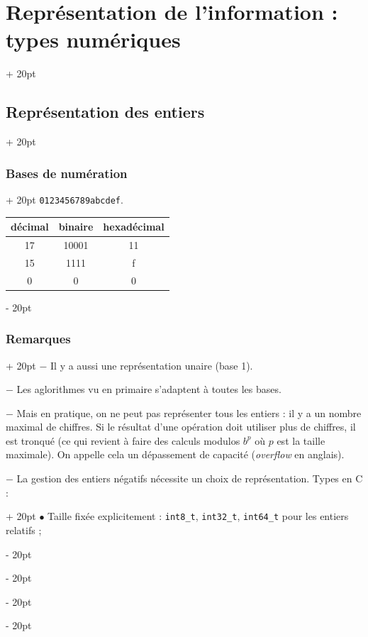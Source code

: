 \documentclass[a4paper, 12pt, twoside]{article}
\newcommand{\ind}[1][20pt]{\advance\leftskip + #1}
\newcommand{\deind}[1][20pt]{\advance\leftskip - #1}
\newenvironment{indentedenv}[1][20pt]{\par \ind[#1]}{\par \deind}
\newenvironment{indt}[2][20pt]{#2 \begin{indentedenv}[#1]}{\end{indentedenv}} %
\begin{document}
\begin{indt}{\section{Représentation de l'information : types numériques}}
\begin{indt}{\subsection{Représentation des entiers}}
\begin{indt}{\subsubsection{Bases de numération}}
                \texttt{0123456789abcdef}.
                
                \vspace{12pt}
                
                \begin{tabular}{|c|c|c|}
                    \hline
                    décimal & binaire & hexadécimal
                    \\
                    \hline
                    17 & 10001 & 11
                    \\
                    \hline
                    15 & 1111 & f
                    \\
                    \hline
                    0 & 0 & 0
                    \\
                    \hline
                \end{tabular}
            \end{indt}
            
            \vspace{12pt}
            
            \begin{indt}{\subsubsection{Remarques}}
                $-$ Il y a aussi une représentation unaire (base 1).
                
                \vspace{6pt}
                
                $-$ Les aglorithmes vu en primaire s'adaptent à toutes les bases.
                
                \vspace{6pt}
                
                $-$ Mais en pratique, on ne peut pas représenter tous les entiers : il y a un nombre maximal de chiffres. Si le résultat d'une opération doit utiliser plus de chiffres, il est tronqué (ce qui revient à faire des calculs modulos $b^p$ où $p$ est la taille maximale). On appelle cela un dépassement de capacité (\textit{overflow} en anglais).
                
                \vspace{6pt}
                
                \begin{indt}{$-$ La gestion des entiers négatifs nécessite un choix de représentation. Types en C :}
                    $\bullet$ Taille fixée explicitement : \texttt{int8\_t}, \texttt{int32\_t}, \texttt{int64\_t} pour les entiers relatifs ;
                    

\end{indt}
\end{indt}
\end{indt}
\end{indt}
\end{document}
